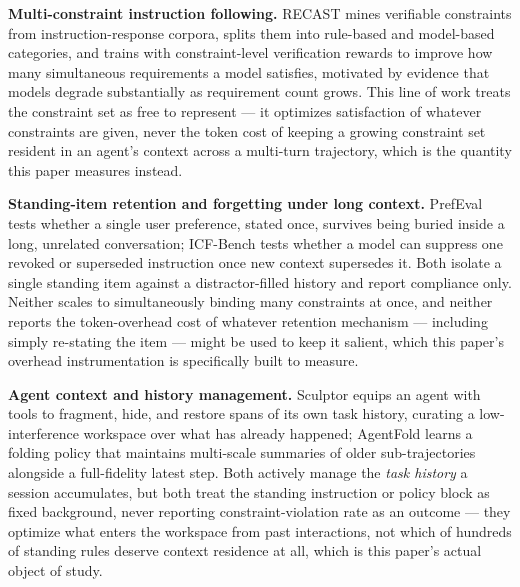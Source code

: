 \documentclass[11pt]{article}
\begin{document}
\textbf{Multi-constraint instruction following.} RECAST mines verifiable constraints from instruction-response corpora, splits them into rule-based and model-based categories, and trains with constraint-level verification rewards to improve how many simultaneous requirements a model satisfies, motivated by evidence that models degrade substantially as requirement count grows. This line of work treats the constraint set as free to represent --- it optimizes satisfaction of whatever constraints are given, never the token cost of keeping a growing constraint set resident in an agent's context across a multi-turn trajectory, which is the quantity this paper measures instead.

\textbf{Standing-item retention and forgetting under long context.} PrefEval tests whether a single user preference, stated once, survives being buried inside a long, unrelated conversation; ICF-Bench tests whether a model can suppress one revoked or superseded instruction once new context supersedes it. Both isolate a single standing item against a distractor-filled history and report compliance only. Neither scales to simultaneously binding many constraints at once, and neither reports the token-overhead cost of whatever retention mechanism --- including simply re-stating the item --- might be used to keep it salient, which this paper's overhead instrumentation is specifically built to measure.

\textbf{Agent context and history management.} Sculptor equips an agent with tools to fragment, hide, and restore spans of its own task history, curating a low-interference workspace over what has already happened; AgentFold learns a folding policy that maintains multi-scale summaries of older sub-trajectories alongside a full-fidelity latest step. Both actively manage the \emph{task history} a session accumulates, but both treat the standing instruction or policy block as fixed background, never reporting constraint-violation rate as an outcome --- they optimize what enters the workspace from past interactions, not which of hundreds of standing rules deserve context residence at all, which is this paper's actual object of study.
\end{document}
